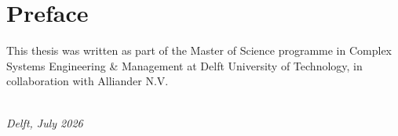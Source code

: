 \chapter*{Preface}

\noindent This thesis was written as part of the Master of Science programme in Complex Systems Engineering \& Management at Delft University of Technology, in collaboration with Alliander N.V.

\bigskip


\bigskip

\noindent [Text]

\vfill

\begin{flushright}
{\makeatletter\itshape
    \@author \\
    Delft, July 2026
\makeatother}
\end{flushright}